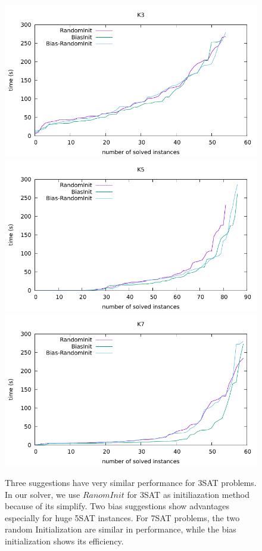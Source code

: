 \documentclass[12pt,a4paper,twoside]{scrartcl}
\numberwithin{equation}{section}
\begin{document}
\begin{figure}[H]
 \label{Experiment cactus}
  \includegraphics[scale =0.8]{DATA/K3/e1.pdf}
  \includegraphics[scale = 0.8]{DATA/K5/e1.pdf}
  \includegraphics[scale = 0.8]{DATA/K7/e1.pdf}
  \label{Experiment 1 k357 cactus plot}
  \caption{Three suggestions have very similar performance for 3SAT problems. In our solver, we use $RanomInit$ for 3SAT as initiliazation method because of its simplify. Two bias suggestions show advantages especially for huge 5SAT instances. For 7SAT problems, the two random Initialization are similar in performance, while the bias initialization shows its efficiency.}
\end{figure}
\clearpage
\end{document}
